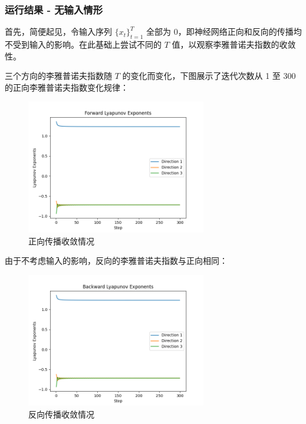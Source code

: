 \clearpage

\subsubsection{运行结果 - 无输入情形}

首先，简便起见，令输入序列 $\{x_t\}_{t=1}^T$ 全部为 0，即神经网络正向和反向的传播均不受到输入的影响。在此基础上尝试不同的 $T$ 值，以观察李雅普诺夫指数的收敛性。

三个方向的李雅普诺夫指数随 $T$ 的变化而变化，下图展示了迭代次数从 1 至 300 的正向李雅普诺夫指数变化规律：

\begin{figure}[htbp]
  \centering
  \includegraphics[width=0.7\textwidth]{figures/lyapunov_exponents_forward.png}
  \caption{正向传播收敛情况}
  \label{fig:example}
\end{figure}

由于不考虑输入的影响，反向的李雅普诺夫指数与正向相同：

\begin{figure}[htbp]
  \centering
  \includegraphics[width=0.7\textwidth]{figures/lyapunov_exponents_backward.png}
  \caption{反向传播收敛情况}
  \label{fig:example}
\end{figure}

